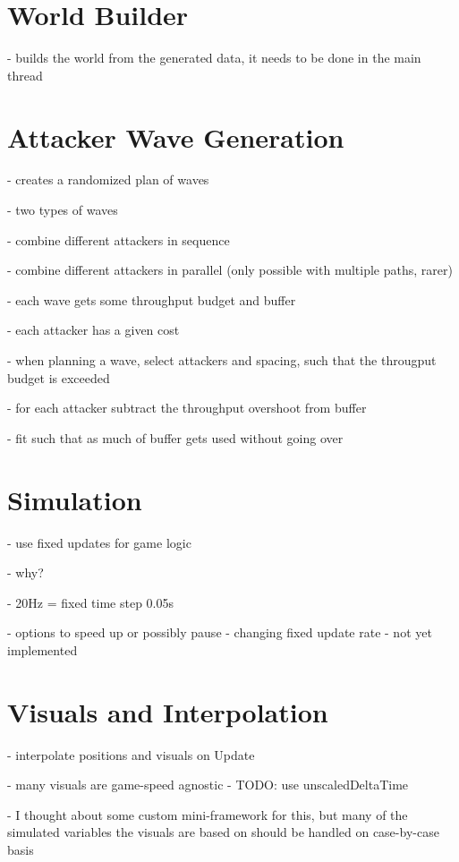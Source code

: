 \section{World Builder}

- builds the world from the generated data, it needs to be done in the main thread

\section{Attacker Wave Generation}

- creates a randomized plan of waves

- two types of waves

- combine different attackers in sequence

- combine different attackers in parallel (only possible with multiple paths, rarer)

- each wave gets some throughput budget and buffer

- each attacker has a given cost

- when planning a wave, select attackers and spacing, such that the througput budget is exceeded

- for each attacker subtract the throughput overshoot from buffer

- fit such that as much of buffer gets used without going over

\section{Simulation}

- use fixed updates for game logic

- why?

- 20Hz = fixed time step 0.05s

- options to speed up or possibly pause - changing fixed update rate - not yet implemented

\section{Visuals and Interpolation}

- interpolate positions and visuals on Update

- many visuals are game-speed agnostic     - TODO: use unscaledDeltaTime

- I thought about some custom mini-framework for this, but many of the simulated variables the visuals are based on should be handled on case-by-case basis

